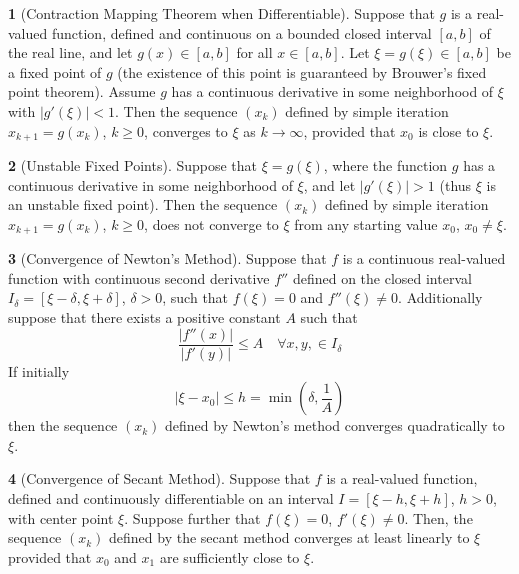 \documentclass[12pt]{article}
\theoremstyle{definition}
\newtheorem{theorem}{\color{ForestGreen}{\textbf{Theorem}}}
\begin{document}
\begin{theorem}[Contraction Mapping Theorem when Differentiable]
Suppose that $g$ is a real-valued function, defined and continuous on a bounded closed interval $[a,b]$ of the real line, and let $g(x) \in [a,b]$ for all $x \in [a,b]$. Let $\xi= g(\xi) \in [a,b]$ be a fixed point of $g$ (the existence of this point is guaranteed by Brouwer's fixed point theorem). Assume $g$ has a continuous derivative in some neighborhood of $\xi$ with $|g'(\xi)| < 1$. Then the sequence $(x_k)$ defined by simple iteration $x_{k+1} = g(x_k)$, $k \geq 0$, converges to $\xi$ as $k \to \infty$, provided that $x_0$ is close to $\xi$.
\end{theorem}

\begin{theorem}[Unstable Fixed Points]
Suppose that $\xi = g(\xi)$, where the function $g$ has a continuous derivative in some neighborhood of $\xi$, and let $|g'(\xi)| > 1$ (thus $\xi$ is an unstable fixed point). Then the sequence $(x_k)$ defined by simple iteration $x_{k+1} = g(x_k)$, $k \geq 0$, does not converge to $\xi$ from any starting value $x_0$, $x_0 \neq \xi$.
\end{theorem}

\begin{theorem}[Convergence of Newton's Method]
Suppose that $f$ is a continuous real-valued function with continuous second derivative $f''$ defined on the closed interval $I_\delta = [\xi - \delta, \xi + \delta]$, $\delta > 0$, such that $f(\xi) = 0$ and $f''(\xi) \neq 0$. Additionally suppose that there exists a positive constant $A$ such that
\begin{equation}
\frac{|f''(x)|}{|f'(y)|} \leq A \quad \forall x,y, \in I_\delta
\end{equation}
If initially
\begin{equation}
|\xi - x_0| \leq h = \min(\delta, \frac{1}{A})
\end{equation}
then the sequence $(x_k)$ defined by Newton's method converges quadratically to $\xi$.
\end{theorem}

\begin{theorem}[Convergence of Secant Method]
Suppose that $f$ is a real-valued function, defined and continuously differentiable on an interval $I = [\xi - h, \xi + h]$, $h > 0$, with center point $\xi$. Suppose further that $f(\xi) = 0$, $f'(\xi) \neq 0$. Then, the sequence $(x_k)$ defined by the secant method converges at least linearly to $\xi$ provided that $x_0$ and $x_1$ are sufficiently close to $\xi$.
\end{theorem}
\end{document}
